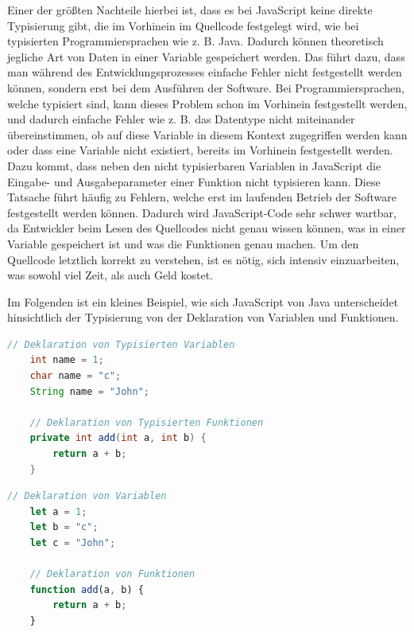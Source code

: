 Einer der größten Nachteile hierbei ist, dass es bei JavaScript keine direkte Typisierung gibt, die im Vorhinein im Quellcode festgelegt wird, wie bei typisierten Programmiersprachen wie z. B. Java. Dadurch können theoretisch jegliche Art von Daten in einer Variable gespeichert werden. Das führt dazu, dass man während des Entwicklungsprozesses einfache Fehler nicht festgestellt werden können, sondern erst bei dem Ausführen der Software. Bei Programmiersprachen, welche typisiert sind, kann dieses Problem schon im Vorhinein festgestellt werden, und dadurch einfache Fehler wie z. B. das Datentype nicht miteinander übereinstimmen, ob auf diese Variable in diesem Kontext zugegriffen werden kann oder dass eine Variable nicht existiert, bereits im Vorhinein festgestellt werden. Dazu kommt, dass neben den nicht typisierbaren Variablen in JavaScript die Eingabe- und Ausgabeparameter einer Funktion nicht typisieren kann. Diese Tatsache führt häufig zu Fehlern, welche erst im laufenden Betrieb der Software festgestellt werden können. Dadurch wird JavaScript-Code sehr schwer wartbar, da Entwickler beim Lesen des Quellcodes nicht genau wissen können, was in einer Variable gespeichert ist und was die Funktionen genau machen. Um den Quellcode letztlich korrekt zu verstehen, ist es nötig, sich intensiv einzuarbeiten, was sowohl viel Zeit, als auch Geld kostet.

Im Folgenden ist ein kleines Beispiel, wie sich JavaScript von Java unterscheidet hinsichtlich der Typisierung von der Deklaration von Variablen und Funktionen.

\begin{lstlisting}[caption=Java Variablen und Funktion deklarations Beispiel, label=variables-and-functions-example-java, language=Java]
    // Deklaration von Typisierten Variablen
    int name = 1;
    char name = "c";
    String name = "John";

    // Deklaration von Typisierten Funktionen
    private int add(int a, int b) {
        return a + b;
    }
\end{lstlisting}

\begin{lstlisting}[caption=JavaScript Variablen und Funktion deklarations Beispiel, label=variables-and-functions-example-javascript, language=JavaScript]
    // Deklaration von Variablen
    let a = 1;
    let b = "c";
    let c = "John";

    // Deklaration von Funktionen
    function add(a, b) {
        return a + b;
    }
\end{lstlisting}

